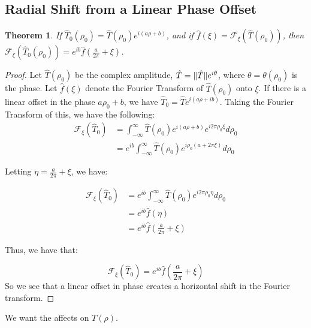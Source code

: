 \documentclass[oneside]{book}
\theoremstyle{mystyle}
\newtheorem{theorem}{Theorem}[section]
\DeclarePairedDelimiter\norm{\lVert}{\rVert}
\begin{document}
\subsection{Radial Shift from a Linear Phase Offset}
\begin{theorem}
If $\hat{T}_0(\rho_0) = \hat{T}(\rho_0)e^{i(a\rho+b)}$, and if $\hat{f}(\xi) = \mathcal{F}_{\xi}(\hat{T}(\rho_0))$, then $\mathcal{F}_{\xi}(\hat{T}_{0}(\rho_0)) = e^{ib}\hat{f}(\frac{a}{2\pi}+\xi)$.
\end{theorem}
\begin{proof}
\noindent Let $\hat{T}(\rho_0)$ be the complex amplitude, $\hat{T} = \norm{\hat{T}}e^{i\theta}$, where $\theta = \theta(\rho_0)$ is the phase. Let $\hat{f}(\xi)$ denote the Fourier Transform of $\hat{T}(\rho_0)$ onto $\xi$. If there is a linear offset in the phase $a\rho_0+b$, we have $\hat{T}_{0} = \hat{T}e^{i(a\rho+ib)}$. Taking the Fourier Transform of this, we have the following:
\begin{align*}
\nonumber \mathcal{F}_{\xi} (\hat{T}_{0})&= \int_{-\infty}^{\infty}\hat{T}(\rho_0)e^{i(a\rho+b)}e^{i2\pi \rho_0 \xi}d\rho_0\\
&=e^{ib} \int_{-\infty}^{\infty} \hat{T}(\rho_0)e^{i\rho_0(a+2\pi \xi)}d\rho_0
\end{align*}

Letting $\eta = \frac{a}{2\pi}+\xi$, we have:

\begin{align*}
\nonumber \mathcal{F}_{\xi} (\hat{T}_{0}) &= e^{ib}\int_{-\infty}^{\infty}\hat{T}(\rho_0)e^{i2\pi\rho_{0}\eta}d\rho_0 \\
\nonumber &= e^{ib}\hat{f}(\eta)\\
		 &= e^{ib}\hat{f}(\frac{a}{2\pi}+\xi)
\end{align*}

Thus, we have that:

\begin{equation*}
\mathcal{F}_{\xi} (\hat{T}_{0}) = e^{ib}\hat{f}(\frac{a}{2\pi}+\xi)
\end{equation*}
So we see that a linear offset in phase creates a horizontal shift in the Fourier transform.
\end{proof}

We want the affects on $T(\rho)$.
\end{document}
